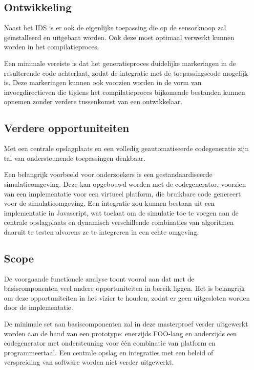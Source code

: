 \subsection{Ontwikkeling}
\label{subsection:arch-integration}

Naast het IDS is er ook de eigenlijke toepassing die op de sensorknoop zal
ge\"installeerd en uitgebaat worden. Ook deze moet optimaal verwerkt kunnen
worden in het compilatieproces.

Een minimale vereiste is dat het generatieproces duidelijke markeringen in de
resulterende code achterlaat, zodat de integratie met de toepassingscode
mogelijk is. Deze markeringen kunnen ook voorzien worden in de vorm van
invoegdirectieven die tijdens het compilatieproces bijkomende bestanden kunnen
opnemen zonder verdere tussenkomst van een ontwikkelaar.

\subsection{Verdere opportuniteiten}
\label{subsection:arch-opportunities}

Met een centrale opslagplaats en een volledig geautomatiseerde codegeneratie
zijn tal van ondersteunende toepassingen denkbaar.

Een belangrijk voorbeeld voor onderzoekers is een gestandaardiseerde
simulatieomgeving. Deze kan opgebouwd worden met de codegenerator, voorzien van
een implementatie voor een virtueel platform, die bruikbare code genereert voor
de simulatieomgeving. Een integratie zou kunnen bestaan uit een implementatie
in Javascript, wat toelaat om de simulatie toe te voegen aan de centrale
opslagplaats en dynamisch verschillende combinaties van algoritmen daaruit te
testen alvorens ze te integreren in een echte omgeving.

\subsection{Scope}
\label{subsection:arch-scope}

De voorgaande functionele analyse toont vooral aan dat met de basiscomponenten
veel andere opportuniteiten in bereik liggen. Het is belangrijk om deze
opportuniteiten in het vizier te houden, zodat er geen uitgesloten worden door
de implementatie.

De minimale set aan basiscomponenten zal in deze masterproef verder uitgewerkt
worden aan de hand van een prototype: enerzijds FOO-lang en anderzijds een
codegenerator met ondersteuning voor \'e\'en combinatie van platform en
programmeertaal. Een centrale opslag en integraties met een beleid of
verspreiding van software worden niet verder uitgewerkt.


